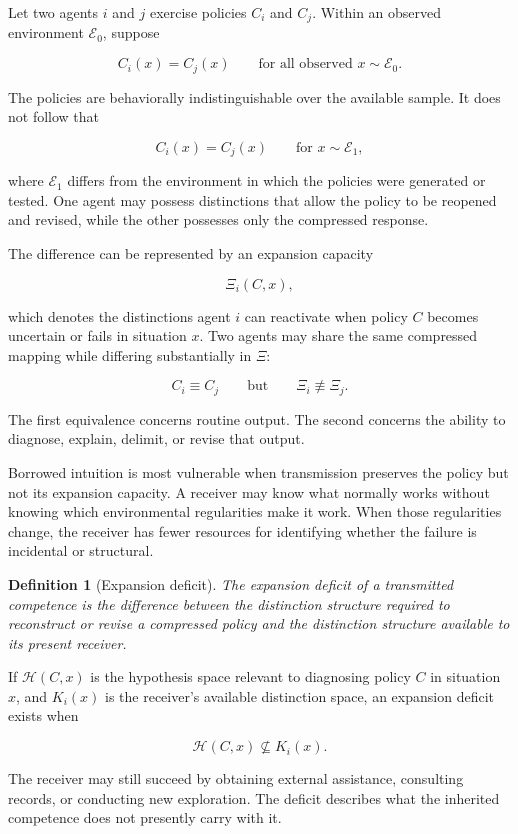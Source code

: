 \documentclass[11pt]{article}
\newtheorem{definition}[proposition]{Definition}
\begin{document}
Let two agents $i$ and $j$ exercise policies $C_i$ and $C_j$. Within an observed environment $\mathcal{E}_0$, suppose

\[
C_i(x)=C_j(x)
\qquad
\text{for all observed } x \sim \mathcal{E}_0.
\]

The policies are behaviorally indistinguishable over the available sample. It does not follow that

\[
C_i(x)=C_j(x)
\qquad
\text{for } x \sim \mathcal{E}_1,
\]

where $\mathcal{E}_1$ differs from the environment in which the policies were generated or tested. One agent may possess distinctions that allow the policy to be reopened and revised, while the other possesses only the compressed response.

The difference can be represented by an expansion capacity

\[
\Xi_i(C,x),
\]

which denotes the distinctions agent $i$ can reactivate when policy $C$ becomes uncertain or fails in situation $x$. Two agents may share the same compressed mapping while differing substantially in $\Xi$:

\[
C_i \equiv C_j
\qquad \text{but} \qquad
\Xi_i \not\equiv \Xi_j.
\]

The first equivalence concerns routine output. The second concerns the ability to diagnose, explain, delimit, or revise that output.

Borrowed intuition is most vulnerable when transmission preserves the policy but not its expansion capacity. A receiver may know what normally works without knowing which environmental regularities make it work. When those regularities change, the receiver has fewer resources for identifying whether the failure is incidental or structural.

\begin{definition}[Expansion deficit]
The expansion deficit of a transmitted competence is the difference between the distinction structure required to reconstruct or revise a compressed policy and the distinction structure available to its present receiver.
\end{definition}

If $\mathcal{H}(C,x)$ is the hypothesis space relevant to diagnosing policy $C$ in situation $x$, and $K_i(x)$ is the receiver's available distinction space, an expansion deficit exists when

\[
\mathcal{H}(C,x)
\not\subseteq
K_i(x).
\]

The receiver may still succeed by obtaining external assistance, consulting records, or conducting new exploration. The deficit describes what the inherited competence does not presently carry with it.
\end{document}
